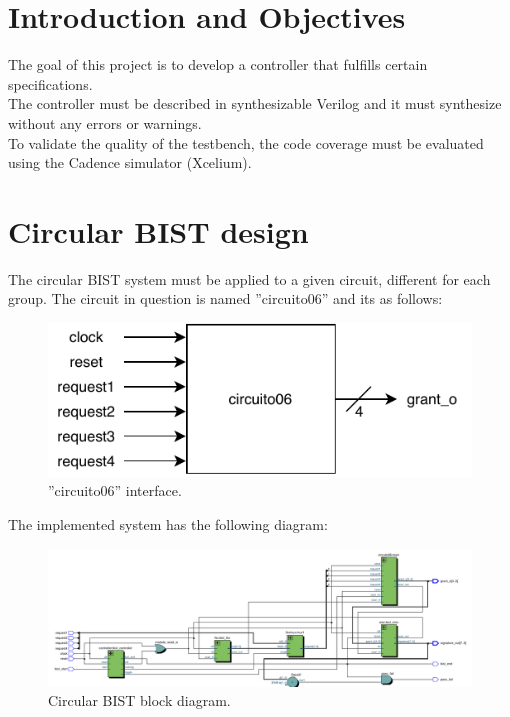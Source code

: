 \documentclass[12pt]{article}
\begin{document}
	\newpage

    \tableofcontents

	\newpage



	\section{Introduction and Objectives}
	The goal of this project is to develop a controller that fulfills certain specifications.\\
	The controller must be described in synthesizable Verilog and it must synthesize without any errors or warnings. \\
	To validate the quality of the testbench, the code coverage must be evaluated using the Cadence simulator (Xcelium).
	
	\section{Circular BIST design}
	The circular BIST system must be applied to a given circuit, different for each group. The circuit in question is named ''circuito06'' and its as follows: 
	\begin{figure}[!htb]
        \centering
        \includegraphics[scale=1]{circuito06.pdf}
            \caption{''circuito06'' interface.}
            \label{fig:ci}
    \end{figure}
    
    The implemented system has the following diagram:
    
    \begin{figure}[!htb]
        \centering
        \includegraphics[scale=0.8]{block_diagram.pdf}
            \caption{Circular BIST block diagram.}
            \label{fig:bd}
    \end{figure}
    
\end{document}
